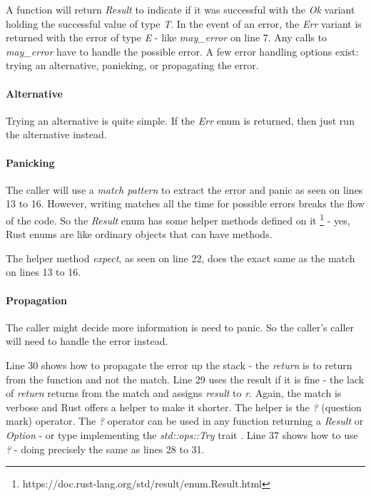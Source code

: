 
A function will return \textit{Result} to indicate if it was successful with the \textit{Ok} variant holding the successful value of type \textit{T}.
In the event of an error, the \textit{Err} variant is returned with the error of type \textit{E} - like \textit{may\_error} on line 7.
Any calls to \textit{may\_error} have to handle the possible error.
A few error handling options exist: trying an alternative, panicking, or propagating the error.

\paragraph{Alternative}
Trying an alternative is quite simple.
If the \textit{Err} enum is returned, then just run the alternative instead.

\paragraph{Panicking}
The caller will use a \textit{match pattern} to extract the error and panic as seen on lines 13 to 16.
However, writing matches all the time for possible errors breaks the flow of the code.
So the \textit{Result} enum has some helper methods defined on it \footnote{https://doc.rust-lang.org/std/result/enum.Result.html} - yes, Rust enums are like ordinary objects that can have methods.

The helper method \textit{expect}, as seen on line 22, does the exact same as the match on lines 13 to 16.

\paragraph{Propagation}
The caller might decide more information is need to panic.
So the caller's caller will need to handle the error instead.

Line 30 shows how to propagate the error up the stack - the \textit{return} is to return from the function and not the match.
Line 29 uses the result if it is fine - the lack of \textit{return} returns from the match and assigns \textit{result} to \textit{r}.
Again, the match is verbose and Rust offers a helper to make it shorter.
The helper is the \textit{?} (question mark) operator.
The \textit{?} operator can be used in any function returning a \textit{Result} or \textit{Option} - or type implementing the \textit{std::ops::Try} trait \cite{klabnik_2019_01}.
Line 37 shows how to use \textit{?} - doing precisely the same as lines 28 to 31.


